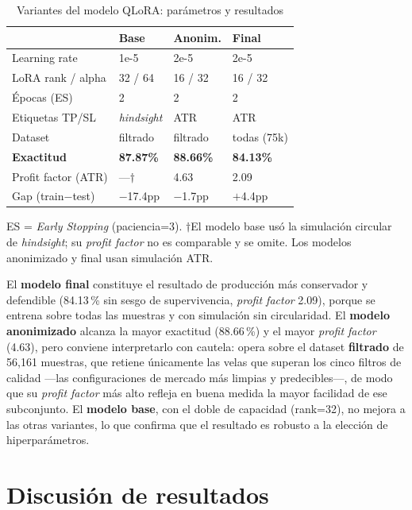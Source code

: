 \documentclass[10pt,twocolumn]{article}
\begin{document}
\begin{table}[H]
\centering
\caption{Variantes del modelo QLoRA: par\'ametros y resultados}
\label{tab:qlora_configs}
\footnotesize
\begin{tabularx}{\columnwidth}{lXXX}
\toprule
 & \textbf{Base} & \textbf{Anonim.} & \textbf{Final} \\
\midrule
Learning rate & 1e-5 & 2e-5 & 2e-5 \\
LoRA rank / alpha & 32 / 64 & 16 / 32 & 16 / 32 \\
\'Epocas (ES) & 2 & 2 & 2 \\
Etiquetas TP/SL & \textit{hindsight} & ATR & ATR \\
Dataset & filtrado & filtrado & todas (75k) \\
\midrule
\textbf{Exactitud} & \textbf{87.87\%} & \textbf{88.66\%} & \textbf{84.13\%} \\
Profit factor (ATR) & ---$\dagger$ & 4.63 & 2.09 \\
Gap (train$-$test) & $-$17.4pp & $-$1.7pp & $+$4.4pp \\
\bottomrule
\end{tabularx}
{\scriptsize ES = \textit{Early Stopping} (paciencia=3). $\dagger$El modelo base us\'o la simulaci\'on circular de \textit{hindsight}; su \textit{profit factor} no es comparable y se omite. Los modelos anonimizado y final usan simulaci\'on ATR.}
\end{table}

El \textbf{modelo final} constituye el resultado de producci\'on m\'as conservador y defendible (84.13\,\% sin sesgo de supervivencia, \textit{profit factor} 2.09), porque se entrena sobre todas las muestras y con simulaci\'on sin circularidad. El \textbf{modelo anonimizado} alcanza la mayor exactitud (88.66\,\%) y el mayor \textit{profit factor} (4.63), pero conviene interpretarlo con cautela: opera sobre el dataset \textbf{filtrado} de 56,161 muestras, que retiene \'unicamente las velas que superan los cinco filtros de calidad ---las configuraciones de mercado m\'as limpias y predecibles---, de modo que su \textit{profit factor} m\'as alto refleja en buena medida la mayor facilidad de ese subconjunto. El \textbf{modelo base}, con el doble de capacidad (rank=32), no mejora a las otras variantes, lo que confirma que el resultado es robusto a la elecci\'on de hiperpar\'ametros.

\section{Discusi\'on de resultados}
\label{sec:discussion}
\end{document}
